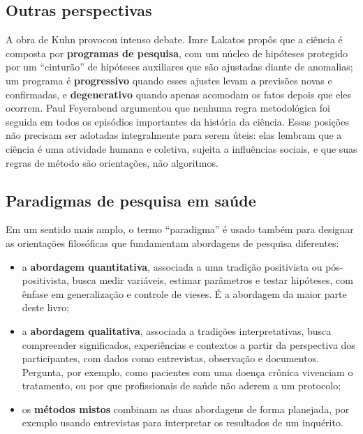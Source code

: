 \documentclass[
]{book}
\providecommand{\tightlist}{%
  \setlength{\itemsep}{0pt}\setlength{\parskip}{0pt}}
\begin{document}
\subsection{Outras perspectivas}\label{outras-perspectivas}

A obra de Kuhn provocou intenso debate. Imre Lakatos propôs que a ciência é composta por \textbf{programas de pesquisa}, com um núcleo de hipóteses protegido por um ``cinturão'' de hipóteses auxiliares que são ajustadas diante de anomalias; um programa é \textbf{progressivo} quando esses ajustes levam a previsões novas e confirmadas, e \textbf{degenerativo} quando apenas acomodam os fatos depois que eles ocorrem. Paul Feyerabend argumentou que nenhuma regra metodológica foi seguida em todos os episódios importantes da história da ciência. Essas posições não precisam ser adotadas integralmente para serem úteis: elas lembram que a ciência é uma atividade humana e coletiva, sujeita a influências sociais, e que suas regras de método são orientações, não algoritmos.

\subsection{Paradigmas de pesquisa em saúde}\label{paradigmas-de-pesquisa-em-sauxfade}

Em um sentido mais amplo, o termo ``paradigma'' é usado também para designar as orientações filosóficas que fundamentam abordagens de pesquisa diferentes:

\begin{itemize}
\tightlist
\item
  a \textbf{abordagem quantitativa}, associada a uma tradição positivista ou pós-positivista, busca medir variáveis, estimar parâmetros e testar hipóteses, com ênfase em generalização e controle de vieses. É a abordagem da maior parte deste livro;
\item
  a \textbf{abordagem qualitativa}, associada a tradições interpretativas, busca compreender significados, experiências e contextos a partir da perspectiva dos participantes, com dados como entrevistas, observação e documentos. Pergunta, por exemplo, como pacientes com uma doença crônica vivenciam o tratamento, ou por que profissionais de saúde não aderem a um protocolo;
\item
  os \textbf{métodos mistos} combinam as duas abordagens de forma planejada, por exemplo usando entrevistas para interpretar os resultados de um inquérito.
\end{itemize}
\end{document}
